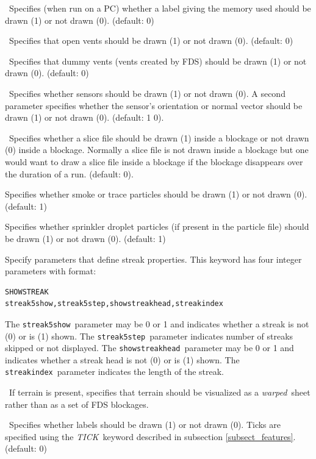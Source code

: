 \documentclass[11pt,twoside]{book}
\newcommand{\hitem}[1]{\item[{\bf #1} \hfill]}
\begin{document}
\hitem{SHOWMEMLOAD}\ Specifies (when run on a PC) whether a label
giving the memory used should be drawn (1) or not drawn (0).
(default: 0)

\hitem{SHOWOPENVENTS}\ Specifies that open vents should be drawn
(1) or not drawn (0).  (default: 0)

\hitem{SHOWDUMMYVENTS}\ Specifies that dummy vents (vents created
by FDS) should be drawn (1) or not drawn (0).  (default: 0)

\hitem{SHOWSENSORS}\ Specifies whether sensors should be drawn (1) or not drawn (0).
A second parameter specifies whether the sensor's orientation or normal vector
should be drawn (1) or not drawn (0). (default: 1 0).

\hitem{SHOWSLICEINOBST}\ Specifies whether a slice file should be drawn (1) inside
a blockage or not drawn (0) inside a blockage.  Normally a slice file
is not drawn inside a blockage but one would want to draw a
slice file inside a blockage if the blockage disappears over the
duration of a run.  (default: 0).


\hitem{SHOWSMOKEPART}Specifies whether smoke or trace particles
should be drawn (1) or not drawn (0). (default: 1)

\hitem{SHOWSPRINKPART}Specifies whether
sprinkler droplet particles (if present in the particle file)
should be drawn (1) or not drawn (0).
(default: 1)

\hitem{SHOWSTREAK}Specify parameters that define streak properties.  This keyword
has four integer parameters with format:
\begin{lstlisting}
SHOWSTREAK
streak5show,streak5step,showstreakhead,streakindex
\end{lstlisting}
The {\tt streak5show}\ parameter may be 0 or 1 and indicates whether a
streak is not (0) or is (1) shown. The {\tt streak5step}\ parameter
indicates number of streaks skipped or not displayed.
The {\tt showstreakhead}\ parameter may be 0 or 1 and indicates
whether a streak head is not (0) or is (1) shown.
The {\tt streakindex}\ parameter indicates the length of the streak.


\hitem{SHOWTERRAIN}\ If terrain is present, specifies that terrain
should be visualized as a {\em warped}\ sheet
rather than as a set of FDS blockages.

\hitem{SHOWTICKS}\ Specifies whether labels should be drawn (1) or
not drawn (0).  Ticks are specified using the {\em TICK}\ keyword
described in subsection \ref{subsect_features}. (default: 0)
\end{document}
